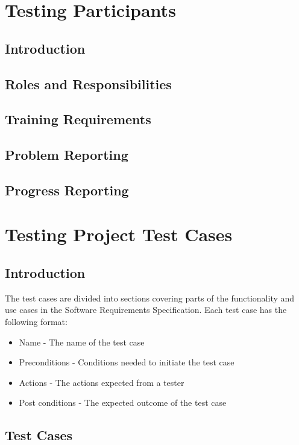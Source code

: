 \documentclass{article}
\begin{document}
\section{Testing Participants} %


\subsection{Introduction}
\subsection{Roles and Responsibilities}
\subsection{Training Requirements}
\subsection{Problem Reporting}
\subsection{Progress Reporting}

\section{Testing Project Test Cases}

\subsection{Introduction} %
	The test cases are divided into sections covering parts of the functionality and use cases in the Software Requirements Specification. Each test case has the following format:
	\begin{itemize}
	  \item Name - The name of the test case
	  \item Preconditions - Conditions needed to initiate the test case
	  \item Actions - The actions expected from a tester
	  \item Post conditions - The expected outcome of the test case
	\end{itemize}

\subsection{Test Cases}
\end{document}
